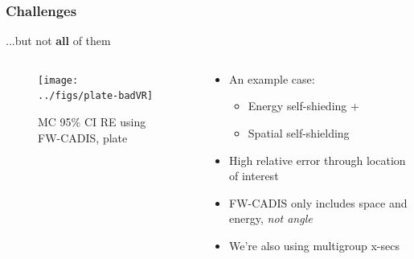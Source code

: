 \documentclass[xcolor=x11names,compress]{beamer}
\renewcommand{\(}{\begin{columns}}
\renewcommand{\)}{\end{columns}}
\newcommand{\<}[1]{\begin{column}{#1}}
\renewcommand{\>}{\end{column}}
\begin{document}
\begin{frame}[fragile]
  \frametitle{Challenges}

	...but not \textbf{all} of them
	\begin{columns}
  	\begin{column}{0.45\textwidth}
  	\begin{center}
  	\begin{figure}
  		\texttt{[image: ../figs/plate-badVR]}
  		\caption{MC 95\% CI RE using FW-CADIS, plate \cite{Wilson2015}}
  	\end{figure}
	\end{center}
  	\end{column}
 	\begin{column}{0.5\textwidth}
  	\begin{center}
  	\begin{itemize}
  		\item An example case: 
		\begin{itemize}
		    \item Energy self-shieding + 
		    \item Spatial self-shielding
		\end{itemize}
		\item High relative error through location of interest \vspace*{0.5 em}
		\pause
		\item FW-CADIS only includes space and energy, \textit{not angle} \vspace*{0.5 em}
		\pause
		\item We're also using multigroup x-secs
	\end{itemize}
  	\end{center}
  	\end{column}
	\end{columns}

\end{frame}


\end{document}
